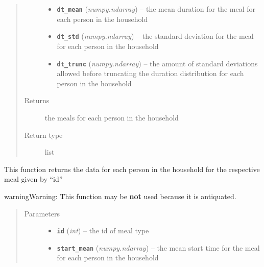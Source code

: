 \documentclass[letterpaper,10pt,english]{sphinxmanual}
\begin{document}
\begin{fulllineitems}
\begin{fulllineitems}
\begin{quote}
\begin{description}
\begin{itemize}
\item {} 
\textbf{\texttt{dt\_mean}} (\emph{numpy.ndarray}) -- the mean duration for the meal for each person in the household

\item {} 
\textbf{\texttt{dt\_std}} (\emph{numpy.ndarray}) -- the standard deviation for the meal for each person in the household

\item {} 
\textbf{\texttt{dt\_trunc}} (\emph{numpy.ndarray}) -- the amount of standard deviations allowed before truncating the         duration distribution for each person in the household

\end{itemize}

\item[{Returns}] \leavevmode
the meals for each person in the household

\item[{Return type}] \leavevmode
list

\end{description}\end{quote}

\end{fulllineitems}


\begin{fulllineitems}
\label{params:params.Params.init_meal_old}
This function returns the data for each person in the household for the respective meal given by ``id''

\begin{notice}{warning}{Warning:}
This function may be \textbf{not} used because it is antiquated.
\end{notice}
\begin{quote}\begin{description}
\item[{Parameters}] \leavevmode\begin{itemize}
\item {} 
\textbf{\texttt{id}} (\emph{int}) -- the id of meal type

\item {} 
\textbf{\texttt{start\_mean}} (\emph{numpy.ndarray}) -- the mean start time for the meal for each person in the household


\end{itemize}
\end{description}
\end{quote}
\end{fulllineitems}
\end{fulllineitems}
\end{document}
